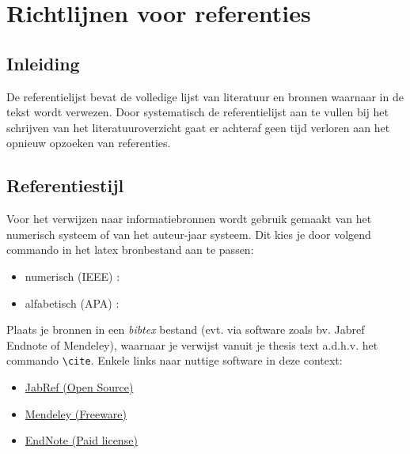 \chapter{Richtlijnen voor referenties}

\section{Inleiding}
De referentielijst bevat de volledige lijst van literatuur en bronnen waarnaar in de tekst wordt verwezen. Door systematisch de referentielijst aan te vullen bij het schrijven van het literatuuroverzicht gaat er achteraf geen tijd verloren aan het opnieuw opzoeken van referenties.

\section{Referentiestijl}

Voor het verwijzen naar informatiebronnen wordt gebruik gemaakt van het numerisch systeem  of van het auteur-jaar systeem. Dit kies je door volgend commando in het latex bronbestand aan te passen:

\begin{itemize}
	\item numerisch (IEEE) : \verb||
	\item alfabetisch (APA) : \verb||
\end{itemize}

Plaats je bronnen in een \textit{bibtex} bestand (evt. via software zoals bv. Jabref Endnote of Mendeley), waarnaar je verwijst vanuit je thesis text a.d.h.v. het commando \verb|\cite|. Enkele links naar nuttige software in deze context:

\begin{itemize}
	\item \href{http://www.jabref.org/}{JabRef (Open Source)}
	\item \href{http://www.mendeley.com}{Mendeley (Freeware)}
	\item \href{http://www.endnote.com}{EndNote (Paid license)}
\end{itemize}

